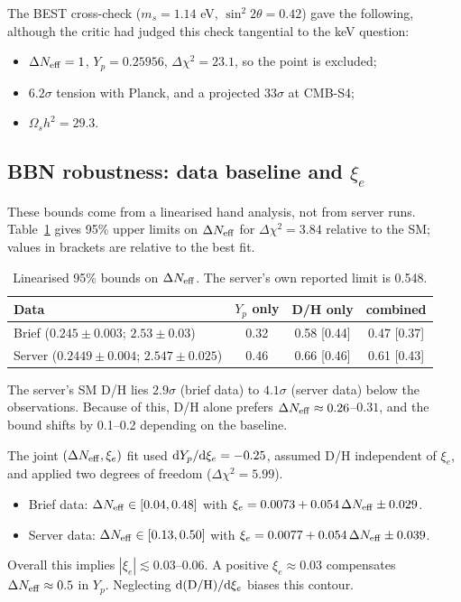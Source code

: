 \documentclass[11pt,a4paper]{article}
\begin{document}
The BEST cross-check ($m_s=1.14$ eV, $\sin^2 2\theta=0.42$) gave the following, although the critic had judged this check tangential to the keV question:
\begin{itemize}
\item $\Delta N_{\rm eff}=1$, $Y_p=0.25956$, $\Delta\chi^2=23.1$, so the point is excluded;
\item $6.2\sigma$ tension with Planck, and a projected $33\sigma$ at CMB-S4;
\item $\Omega_s h^2=29.3$.
\end{itemize}

\subsection{BBN robustness: data baseline and $\xi_e$}
These bounds come from a linearised hand analysis, not from server runs. Table~\ref{tab:rob} gives 95\% upper limits on $\Delta N_{\rm eff}$ for $\Delta\chi^2=3.84$ relative to the SM; values in brackets are relative to the best fit.

\begin{table}[h]
\centering
\begin{tabular}{lccc}
\toprule
Data & $Y_p$ only & D/H only & combined\\
\midrule
Brief ($0.245\pm0.003$; $2.53\pm0.03$) & 0.32 & 0.58 [0.44] & 0.47 [0.37]\\
Server ($0.2449\pm0.004$; $2.547\pm0.025$) & 0.46 & 0.66 [0.46] & 0.61 [0.43]\\
\bottomrule
\end{tabular}
\caption{Linearised 95\% bounds on $\Delta N_{\rm eff}$. The server's own reported limit is 0.548.}
\label{tab:rob}
\end{table}

The server's SM D/H lies $2.9\sigma$ (brief data) to $4.1\sigma$ (server data) below the observations. Because of this, D/H alone prefers $\Delta N_{\rm eff}\approx0.26$--$0.31$, and the bound shifts by 0.1--0.2 depending on the baseline.

The joint $(\Delta N_{\rm eff},\xi_e)$ fit used ${\rm d}Y_p/{\rm d}\xi_e=-0.25$, assumed D/H independent of $\xi_e$, and applied two degrees of freedom ($\Delta\chi^2=5.99$).
\begin{itemize}
\item Brief data: $\Delta N_{\rm eff}\in[0.04,0.48]$ with $\xi_e=0.0073+0.054\,\Delta N_{\rm eff}\pm0.029$.
\item Server data: $\Delta N_{\rm eff}\in[0.13,0.50]$ with $\xi_e=0.0077+0.054\,\Delta N_{\rm eff}\pm0.039$.
\end{itemize}
Overall this implies $|\xi_e|\lesssim0.03$--$0.06$. A positive $\xi_e\approx0.03$ compensates $\Delta N_{\rm eff}\approx0.5$ in $Y_p$. Neglecting ${\rm d(D/H)}/{\rm d}\xi_e$ biases this contour.
\end{document}
